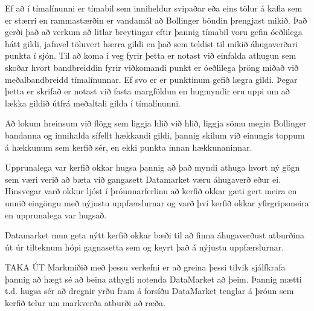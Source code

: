 \documentclass{article}
\begin{document}
Ef að í tímalínunni er tímabil sem inniheldur svipaðar
eða eins tölur á kafla sem er stærri en rammastærðin er
vandamál að Bollinger 
böndin þrengjast mikið. Það gerði það að verkum að
litlar breytingar eftir þannig tímabil voru gefin
óeðlilega hátt gildi, 
jafnvel töluvert hærra gildi en það sem teldist til
mikið áhugaverðari punkta í sjón. Til að koma í veg
fyrir þetta er notast við
einfalda athugun sem skoðar hvort bandbreiddin fyrir
viðkomandi punkt er óeðlilega þröng miðað við
meðalbandbreidd tímalínunnar.
Ef svo er er punktinum gefið lægra gildi. Þegar þetta
er skrifað er notast við fasta margföldun en hugmyndir
eru uppi um að lækka 
gildið útfrá meðaltali gilda í tímalínunni.

Að lokum hreinsum við flögg sem liggja hlið við hlið,
liggja sömu megin Bollinger bandanna og innihalda
sífellt hækkandi gildi, 
þannig skilum við einungis toppum á hækkunum sem kerfið
sér, en ekki punkta innan hækkunaninnar.













Upprunalega var kerfið okkar hugsa þannig að það myndi athuga hvort ný gögn sem væri verið að bæta við gangasett Datamarket væru áhugaverð eður ei. Hinsvegar varð okkur ljóst í þróunnarferlinu að kerfið okkar gæti gert meira en unnið eingöngu með nýjustu uppfærslurnar og varð því kerfið okkar yfirgripsmeira en upprunalega var hugsað.

Datamarket mun geta nýtt kerfið okkar bæði til að finna áhugaverðust atburðina út úr tilteknum hópi gagnasetta sem og keyrt það á nýjustu uppfærslurnar.

TAKA ÚT Markmiðið með þessu verkefni er að greina þessi tilvik sjálfkrafa þannig að hægt sé að beina athygli notenda DataMarket að þeim. Þannig mætti t.d. hugsa sér að dregnir yrðu fram á forsíðu DataMarket tenglar á þróun sem kerfið telur um markverða atburði að ræða.
\end{document}
